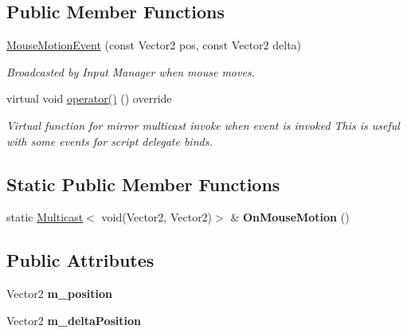 \subsection*{Public Member Functions}
\begin{DoxyCompactItemize}
\item 
\hyperlink{classMouseMotionEvent_ae80aaa461c66ce8796d4ad3930bcc6e2}{Mouse\+Motion\+Event} (const Vector2 pos, const Vector2 delta)
\begin{DoxyCompactList}\small\item\em Broadcasted by Input Manager when mouse moves. \end{DoxyCompactList}\item 
\mbox{\label{classMouseMotionEvent_a79c07f84b0ac5948eb44046db7c420c6}} 
virtual void \hyperlink{classMouseMotionEvent_a79c07f84b0ac5948eb44046db7c420c6}{operator()} () override
\begin{DoxyCompactList}\small\item\em Virtual function for mirror multicast invoke when event is invoked This is useful with some events for script delegate binds. \end{DoxyCompactList}\end{DoxyCompactItemize}
\subsection*{Static Public Member Functions}
\begin{DoxyCompactItemize}
\item 
\mbox{\label{classMouseMotionEvent_a6f99922309ff3384c4192767d368a88b}} 
static \hyperlink{classMulticast}{Multicast}$<$ void(Vector2, Vector2)$>$ \& {\bfseries On\+Mouse\+Motion} ()
\end{DoxyCompactItemize}
\subsection*{Public Attributes}
\begin{DoxyCompactItemize}
\item 
\mbox{\label{classMouseMotionEvent_a8a442de20c51f283248e1100ff027380}} 
Vector2 {\bfseries m\+\_\+position}
\item 
\mbox{\label{classMouseMotionEvent_a3ba0e3af15d3a592a66eb354372aebe2}} 
Vector2 {\bfseries m\+\_\+delta\+Position}
\end{DoxyCompactItemize}
